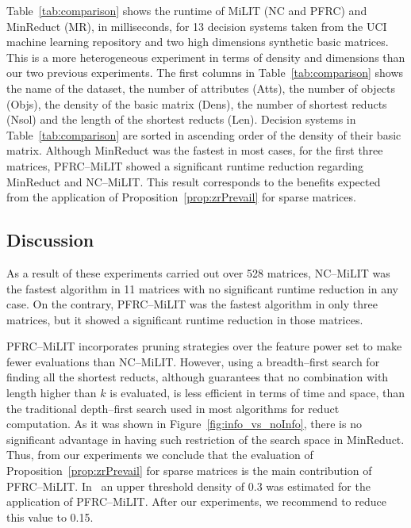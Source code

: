 \documentclass[citenumber]{llncs}
\begin{document}
	Table~\ref{tab:comparison} shows the runtime of MiLIT (NC and PFRC) and MinReduct (MR), in milliseconds, for 13 decision systems taken from the UCI machine learning repository and two high dimensions synthetic basic matrices. This is a more heterogeneous experiment in terms of density and dimensions than our two previous experiments. The first columns in Table~\ref{tab:comparison} shows the name of the dataset, the number of attributes (Atts), the number of objects (Objs), the density of the basic matrix (Dens), the number of shortest reducts (Nsol) and the length of the  shortest reducts (Len). Decision systems in Table~\ref{tab:comparison} are sorted in ascending order of the density of their basic matrix. Although MinReduct was the fastest in most cases, for the first three matrices, PFRC--MiLIT showed a significant runtime reduction regarding MinReduct and NC--MiLIT. This result corresponds to the benefits expected from the application of Proposition~\ref{prop:zrPrevail} for sparse matrices.
%
\subsection{Discussion}
%	
	As a result of these experiments carried out over 528 matrices,  NC--MiLIT was the fastest algorithm in 11 matrices with no significant runtime reduction in any case. On the contrary, PFRC--MiLIT was the fastest algorithm in only three matrices, but it showed a significant runtime reduction in those matrices.  
	
	PFRC--MiLIT incorporates pruning strategies over the feature power set to make fewer evaluations than NC--MiLIT. However, using a breadth--first search for finding all the shortest reducts, although guarantees that no combination with length higher than $k$ is evaluated, is less efficient in terms of time and space, than the traditional depth--first search used in most algorithms for reduct computation. As it was shown in Figure~\ref{fig:info_vs_noInfo}, there is no significant advantage in having such restriction of the search space in MinReduct. Thus, from our experiments we conclude that the evaluation of Proposition~\ref{prop:zrPrevail} for sparse matrices is the main contribution of PFRC--MiLIT. In~\cite{Piza20} an upper threshold density of 0.3 was estimated for the application of  PFRC--MiLIT. After our experiments, we recommend to reduce this value to 0.15.   	
	
\end{document}
